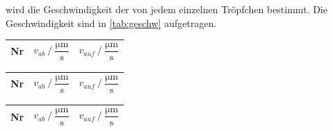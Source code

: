 wird die Geschwindigkeit der von jedem einzelnen Tröpfchen bestimmt.
Die Geschwindigkeit sind in \autoref{tab:geschw} aufgetragen.
\begin{table}[H]
  \caption{Geschwindigkeiten der Öltröpfchen für verschiedene Spannungen}
  \label{tab:geschw}
  \centering
  \begin{minipage}[t]{0.45\textwidth}
      \small
      \label{stab:v157}
      \begin{table}[H]
          \centering
          \begin{tabular}{S S S}
            \toprule
              {Nr}& {$ v_{ab} \mathbin{/} \dfrac{\unit{\micro\meter}}{\unit{\second}}$}&{$ v_{auf} \mathbin{/} \dfrac{\unit{\micro\meter}}{\unit{\second}}$}\\
            \midrule
            
            \bottomrule
          \end{tabular}
        \end{table}
      
  \end{minipage}\qquad
  \begin{minipage}[t]{0.45\textwidth}
      \small
      \label{stab:v175}
      \begin{table}[H]
          \centering
          \begin{tabular}{S S S}
            \toprule
            {Nr}& {$ v_{ab} \mathbin{/} \dfrac{\unit{\micro\meter}}{\unit{\second}}$}&{$ v_{auf} \mathbin{/} \dfrac{\unit{\micro\meter}}{\unit{\second}}$}\\
            \midrule
            
            \bottomrule
          \end{tabular}
        \end{table}
      
  \end{minipage}\qquad
  \begin{minipage}[t]{0.45\textwidth}
      \small
      \label{stab:v200}
      \begin{table}[H]
          \centering
          \begin{tabular}{S S S}
            \toprule
            {Nr}& {$ v_{ab} \mathbin{/} \dfrac{\unit{\micro\meter}}{\unit{\second}}$}&{$ v_{auf} \mathbin{/} \dfrac{\unit{\micro\meter}}{\unit{\second}}$}\\
            \midrule
            

\end{tabular}
\end{table}
\end{minipage}
\end{table}
